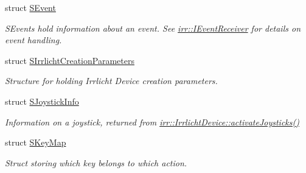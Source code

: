 \begin{DoxyCompactItemize}
struct \hyperlink{structirr_1_1SEvent}{S\+Event}
\begin{DoxyCompactList}\small\item\em S\+Events hold information about an event. See \hyperlink{classirr_1_1IEventReceiver}{irr\+::\+I\+Event\+Receiver} for details on event handling. \end{DoxyCompactList}\item 
struct \hyperlink{structirr_1_1SIrrlichtCreationParameters}{S\+Irrlicht\+Creation\+Parameters}
\begin{DoxyCompactList}\small\item\em Structure for holding Irrlicht Device creation parameters. \end{DoxyCompactList}\item 
struct \hyperlink{structirr_1_1SJoystickInfo}{S\+Joystick\+Info}
\begin{DoxyCompactList}\small\item\em Information on a joystick, returned from \hyperlink{classirr_1_1IrrlichtDevice_af06f8d2c4fdffd1f879e46685bcbc6e3}{irr\+::\+Irrlicht\+Device\+::activate\+Joysticks()} \end{DoxyCompactList}\item 
struct \hyperlink{structirr_1_1SKeyMap}{S\+Key\+Map}
\begin{DoxyCompactList}\small\item\em Struct storing which key belongs to which action. \end{DoxyCompactList}\end{DoxyCompactItemize}
